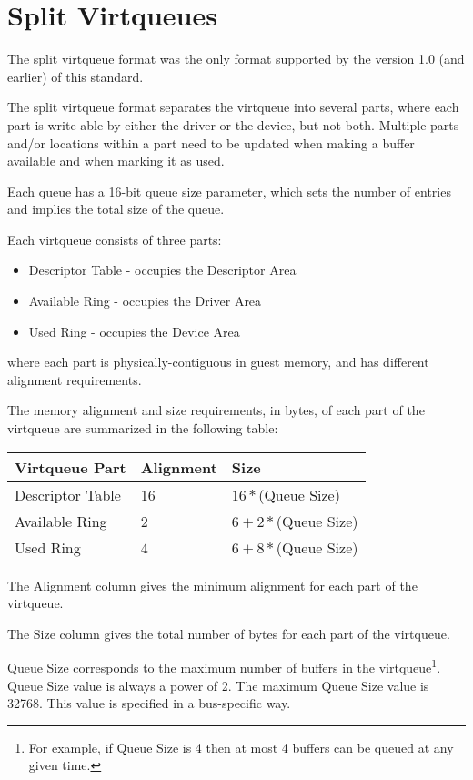 \section{Split Virtqueues}\label{sec:Basic Facilities of a Virtio Device / Split Virtqueues}
The split virtqueue format was the only format supported
by the version 1.0 (and earlier) of this standard.

The split virtqueue format separates the virtqueue into several
parts, where each part is write-able by either the driver or the
device, but not both. Multiple parts and/or locations within
a part need to be updated when making a buffer
available and when marking it as used.

Each queue has a 16-bit queue size
parameter, which sets the number of entries and implies the total size
of the queue.

Each virtqueue consists of three parts:

\begin{itemize}
\item Descriptor Table - occupies the Descriptor Area
\item Available Ring - occupies the Driver Area
\item Used Ring - occupies the Device Area
\end{itemize}

where each part is physically-contiguous in guest memory,
and has different alignment requirements.

The memory alignment and size requirements, in bytes, of each part of the
virtqueue are summarized in the following table:

\begin{tabular}{|l|l|l|}
\hline
Virtqueue Part    & Alignment & Size \\
\hline \hline
Descriptor Table  & 16        & $16 * $(Queue Size) \\
\hline
Available Ring    & 2         & $6 + 2 * $(Queue Size) \\
 \hline
Used Ring         & 4         & $6 + 8 * $(Queue Size) \\
 \hline
\end{tabular}

The Alignment column gives the minimum alignment for each part
of the virtqueue.

The Size column gives the total number of bytes for each
part of the virtqueue.

Queue Size corresponds to the maximum number of buffers in the
virtqueue\footnote{For example, if Queue Size is 4 then at most 4 buffers
can be queued at any given time.}.  Queue Size value is always a
power of 2.  The maximum Queue Size value is 32768.  This value
is specified in a bus-specific way.

